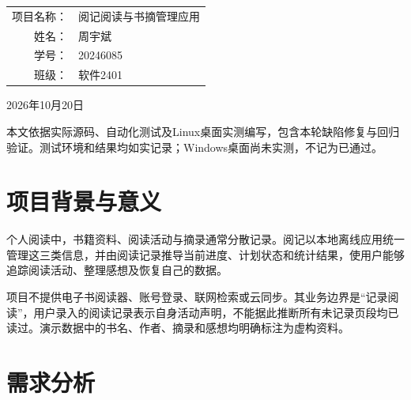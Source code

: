 \documentclass[UTF8,a4paper,11pt,fontset=none]{ctexart}
\begin{document}
\begin{titlepage}\centering
\vspace*{22mm}{\LARGE 全栈开发技术期末项目报告\par}
\vspace{22mm}{\Huge\bfseries 阅记\par}\vspace{5mm}{\Large 阅读与书摘管理应用\par}
\vspace{24mm}\begin{tabular}{rl}项目名称：&阅记阅读与书摘管理应用\\姓名：&周宇斌\\学号：&20246085\\班级：&软件2401\end{tabular}
\vfill{\large 2026年10月20日\par}\vspace{12mm}
\begin{minipage}{.85\linewidth}\small
本文依据实际源码、自动化测试及Linux桌面实测编写，包含本轮缺陷修复与回归验证。测试环境和结果均如实记录；Windows桌面尚未实测，不记为已通过。
\end{minipage}
\end{titlepage}
\tableofcontents\newpage
\section*{项目背景与意义}
个人阅读中，书籍资料、阅读活动与摘录通常分散记录。阅记以本地离线应用统一管理这三类信息，并由阅读记录推导当前进度、计划状态和统计结果，使用户能够追踪阅读活动、整理感想及恢复自己的数据。

项目不提供电子书阅读器、账号登录、联网检索或云同步。其业务边界是“记录阅读”，用户录入的阅读记录表示自身活动声明，不能据此推断所有未记录页段均已读过。演示数据中的书名、作者、摘录和感想均明确标注为虚构资料。
\section{需求分析}
\end{document}
